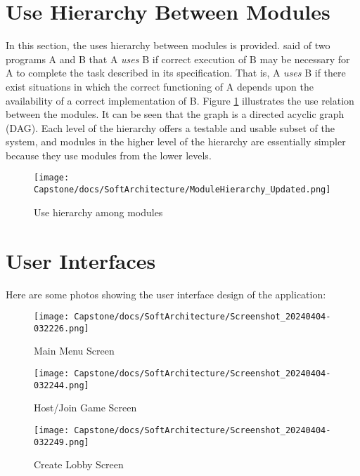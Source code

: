 \documentclass[12pt, titlepage]{article}
\begin{document}
\section{Use Hierarchy Between Modules} \label{SecUse}

In this section, the uses hierarchy between modules is
provided. \citet{Parnas1978} said of two programs A and B that A {\em uses} B if
correct execution of B may be necessary for A to complete the task described in
its specification. That is, A {\em uses} B if there exist situations in which
the correct functioning of A depends upon the availability of a correct
implementation of B.  Figure \ref{FigUH} illustrates the use relation between
the modules. It can be seen that the graph is a directed acyclic graph
(DAG). Each level of the hierarchy offers a testable and usable subset of the
system, and modules in the higher level of the hierarchy are essentially simpler
because they use modules from the lower levels.

\begin{figure}[H]
\centering
\texttt{[image: Capstone/docs/SoftArchitecture/ModuleHierarchy\_Updated.png]}
\caption{Use hierarchy among modules}
\label{FigUH}
\end{figure}

\section{User Interfaces}
Here are some photos showing the user interface design of the application:

\begin{figure}[H]
\centering
\texttt{[image: Capstone/docs/SoftArchitecture/Screenshot\_20240404-032226.png]}
\caption{Main Menu Screen}
\label{FigUI2}
\end{figure}

\begin{figure}[H]
\centering
\texttt{[image: Capstone/docs/SoftArchitecture/Screenshot\_20240404-032244.png]}
\caption{Host/Join Game Screen}
\label{FigUI3}
\end{figure}

\begin{figure}[H]
\centering
\texttt{[image: Capstone/docs/SoftArchitecture/Screenshot\_20240404-032249.png]}
\caption{Create Lobby Screen}
\label{FigUI4}
\end{figure}
\end{document}

